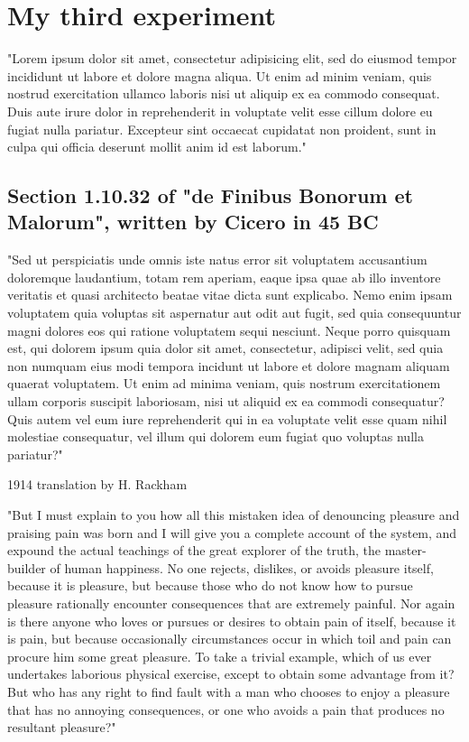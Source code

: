\chapter{My third experiment}
"Lorem ipsum dolor sit amet, consectetur adipisicing elit, sed do eiusmod
tempor incididunt ut labore et dolore magna aliqua. Ut enim ad minim veniam,
quis nostrud exercitation ullamco laboris nisi ut aliquip ex ea commodo
consequat. Duis aute irure dolor in reprehenderit in voluptate velit esse
cillum dolore eu fugiat nulla pariatur. Excepteur sint occaecat cupidatat non
proident, sunt in culpa qui officia deserunt mollit anim id est laborum."

\section{Section 1.10.32 of "de Finibus Bonorum et Malorum", written by
Cicero in 45 BC}


"Sed ut perspiciatis unde omnis iste natus error sit voluptatem accusantium
doloremque laudantium, totam rem aperiam, eaque ipsa quae ab illo inventore
veritatis et quasi architecto beatae vitae dicta sunt explicabo. Nemo enim
ipsam voluptatem quia voluptas sit aspernatur aut odit aut fugit, sed quia
consequuntur magni dolores eos qui ratione voluptatem sequi nesciunt. Neque
porro quisquam est, qui dolorem ipsum quia dolor sit amet, consectetur,
adipisci velit, sed quia non numquam eius modi tempora incidunt ut labore et
dolore magnam aliquam quaerat voluptatem. Ut enim ad minima veniam, quis
nostrum exercitationem ullam corporis suscipit laboriosam, nisi ut aliquid ex
ea commodi consequatur? Quis autem vel eum iure reprehenderit qui in ea
voluptate velit esse quam nihil molestiae consequatur, vel illum qui dolorem
eum fugiat quo voluptas nulla pariatur?"

1914 translation by H. Rackham

"But I must explain to you how all this mistaken idea of denouncing pleasure
and praising pain was born and I will give you a complete account of the
system, and expound the actual teachings of the great explorer of the truth,
the master-builder of human happiness. No one rejects, dislikes, or avoids
pleasure itself, because it is pleasure, but because those who do not know how
to pursue pleasure rationally encounter consequences that are extremely
painful. Nor again is there anyone who loves or pursues or desires to obtain
pain of itself, because it is pain, but because occasionally circumstances
occur in which toil and pain can procure him some great pleasure. To take a
trivial example, which of us ever undertakes laborious physical exercise,
except to obtain some advantage from it? But who has any right to find fault
with a man who chooses to enjoy a pleasure that has no annoying consequences,
or one who avoids a pain that produces no resultant pleasure?"

